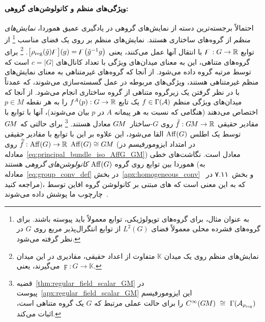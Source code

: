 \paragraph{ویژگی‌های منظم و کانولوشن‌های گروهی:}
احتمالاً برجسته‌ترین دسته از نمایش‌های گروهی در یادگیری عمیق هموردا، \emph{نمایش‌های منظم} از گروه‌های ساختاری هستند.
نمایش‌های منظم بر روی یک فضای مناسب%
\footnote{
	به عنوان مثال، برای گروه‌های توپولوژیکی، توابع معمولاً باید پیوسته باشند.
	برای گروه‌های فشرده محلی معمولاً فضای $L^2(G)$ از توابع انتگرال‌پذیر مربع روی $G$ در نظر گرفته می‌شود.
}
از توابع $\digamma: G \to \mathbb{R}$ با انتقال آنها عمل می‌کنند، یعنی
$\big[ \rho_\textup{reg} (\tilde{g}) \digamma \big](g) = \digamma\big( \tilde{g}^{-1}g \big)$.%
\footnote{
	نمایش‌های منظم روی یک میدان $\mathbb{K}$ متفاوت از اعداد حقیقی، مقادیری در این میدان می‌گیرند، یعنی $\digamma: G \to \mathbb{K}$.
}
برای گروه‌های متناهی، این به معنای میدان‌های ویژگی با تعداد کانال‌های $c = |G|$ است که توسط مرتبه گروه داده می‌شود.
از آنجا که گروه‌های غیرمتناهی به معنای نمایش‌های منظم غیرمتناهی هستند، ویژگی‌های مربوطه در عمل گسسته‌سازی می‌شوند، که عمدتاً با در نظر گرفتن یک زیرگروه متناهی از گروه ساختاری انجام می‌شود.
از آنجا که میدان‌های ویژگی منظم $f \in \Gamma(\mathcal{A})$ یک تابع $f^A(p): G \to \mathbb{R}$ را به هر نقطه $p\in M$ اختصاص می‌دهند (هنگامی که نسبت به هر پیمانه $A$ در $p$ بیان می‌شوند)، آنها با توابع با مقادیر حقیقی $\tilde{f}: G\mkern-1.4muM \to \mathbb{R}$ روی $G$-ساختار~$G\mkern-1.4muM$ معادل هستند.%
\footnote{
	قضیه~\ref{thm:regular_field_scalar_GM} در پیوست~\ref{apx:regular_field_scalar_GM} این ایزومورفیسم
	$C^\infty(\GM)\ \cong\ \Gamma(\A_{\rho_\textup{reg}})$
	را برای حالت عملی مرتبط که $G$ یک گروه متناهی است، اثبات می‌کند.
}
برای حالتی که $G\mkern-1.4muM$ توسط یک اطلس $\operatorname{Aff}(G)$ القا می‌شود، این علاوه بر این با توابع با مقادیر حقیقی $\accentset{\approx}{f}: \operatorname{Aff}(G) \to \mathbb{R}$ روی $\operatorname{Aff}(G) \cong G\mkern-1.4muM$ (در امتداد ایزومورفیسم در معادله~\eqref{eq:principal_bundle_iso_AffG_GM}) معادل است.
نگاشت‌های خطی هموردا بین توابع روی گروه $\operatorname{Aff}(G)$ \emph{کانولوشن‌های گروهی} هستند (به معادله~\eqref{eq:group_conv_def} در بخش~\ref{apx:homogeneous_conv} و بخش~۷.۱۱ در~\cite{gallier2019harmonicRepr} مراجعه کنید)، که به این معنی است که های مبتنی بر کانولوشن گروه افاین توسط چارچوب ما پوشش داده می‌شوند~\cite{Cohen2016-GCNN,Kondor2018-GENERAL,bekkers2020bspline}.


